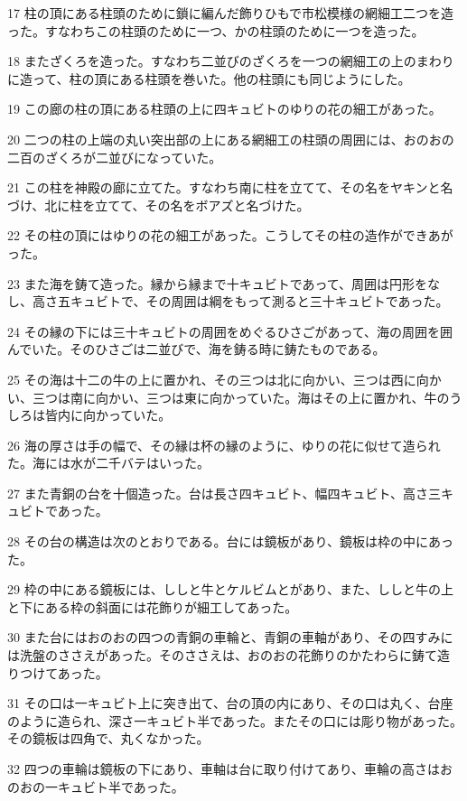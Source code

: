 \par 17 柱の頂にある柱頭のために鎖に編んだ飾りひもで市松模様の網細工二つを造った。すなわちこの柱頭のために一つ、かの柱頭のために一つを造った。
\par 18 またざくろを造った。すなわち二並びのざくろを一つの網細工の上のまわりに造って、柱の頂にある柱頭を巻いた。他の柱頭にも同じようにした。
\par 19 この廊の柱の頂にある柱頭の上に四キュビトのゆりの花の細工があった。
\par 20 二つの柱の上端の丸い突出部の上にある網細工の柱頭の周囲には、おのおの二百のざくろが二並びになっていた。
\par 21 この柱を神殿の廊に立てた。すなわち南に柱を立てて、その名をヤキンと名づけ、北に柱を立てて、その名をボアズと名づけた。
\par 22 その柱の頂にはゆりの花の細工があった。こうしてその柱の造作ができあがった。
\par 23 また海を鋳て造った。縁から縁まで十キュビトであって、周囲は円形をなし、高さ五キュビトで、その周囲は綱をもって測ると三十キュビトであった。
\par 24 その縁の下には三十キュビトの周囲をめぐるひさごがあって、海の周囲を囲んでいた。そのひさごは二並びで、海を鋳る時に鋳たものである。
\par 25 その海は十二の牛の上に置かれ、その三つは北に向かい、三つは西に向かい、三つは南に向かい、三つは東に向かっていた。海はその上に置かれ、牛のうしろは皆内に向かっていた。
\par 26 海の厚さは手の幅で、その縁は杯の縁のように、ゆりの花に似せて造られた。海には水が二千バテはいった。
\par 27 また青銅の台を十個造った。台は長さ四キュビト、幅四キュビト、高さ三キュビトであった。
\par 28 その台の構造は次のとおりである。台には鏡板があり、鏡板は枠の中にあった。
\par 29 枠の中にある鏡板には、ししと牛とケルビムとがあり、また、ししと牛の上と下にある枠の斜面には花飾りが細工してあった。
\par 30 また台にはおのおの四つの青銅の車輪と、青銅の車軸があり、その四すみには洗盤のささえがあった。そのささえは、おのおの花飾りのかたわらに鋳て造りつけてあった。
\par 31 その口は一キュビト上に突き出て、台の頂の内にあり、その口は丸く、台座のように造られ、深さ一キュビト半であった。またその口には彫り物があった。その鏡板は四角で、丸くなかった。
\par 32 四つの車輪は鏡板の下にあり、車軸は台に取り付けてあり、車輪の高さはおのおの一キュビト半であった。
